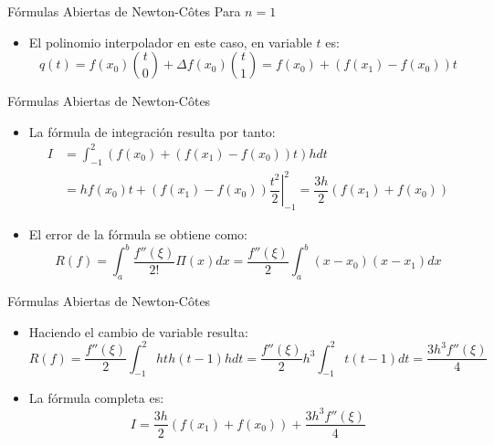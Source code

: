 \documentclass[12pt]{beamer}
\begin{document}
\begin{frame}{F\'ormulas Abiertas de Newton-C\^otes}
Para $n=1$
\begin{center}
\end{center}
\begin{itemize}
  \item El polinomio interpolador en este caso, en variable $t$ es:
  $$
    q(t) = f(x_0)\binom{t}{0}+\Delta f(x_0)\binom{t}{1} = f(x_0)+\left(f(x_1)-f(x_0)\right)t
  $$
  \end{itemize}
\end{frame}
\begin{frame}{F\'ormulas Abiertas de Newton-C\^otes}
  \begin{itemize}
    \item La fórmula de integración resulta por tanto:
    \begin{align*}
      I  & = \int_{-1}^{2}\left(f(x_0)+\left(f(x_1)-f(x_0)\right)t\right)hdt\\
      & = h\left.f(x_0)t+\left(f(x_1)-f(x_0)\right)\dfrac{t^2}{2}\right|_{-1}^{2} = \dfrac{3h}{2}\left(f(x_1)+f(x_0)\right)
    \end{align*}
    \item<2-> El error de la fórmula se obtiene como:
    $$
    R(f) = \int_{a}^{b}\dfrac{f''(\xi)}{2!}\Pi(x)dx = \dfrac{f''(\xi)}{2}\int_{a}^{b}(x-x_0)(x-x_1)dx
    $$
  \end{itemize}
\end{frame}
\begin{frame}{F\'ormulas Abiertas de Newton-C\^otes}
  \begin{itemize}
    \item Haciendo el cambio de variable resulta:
    \small{
    $$
    R(f) = \dfrac{f''(\xi)}{2}\int_{-1}^{2}hth(t-1)hdt = \dfrac{f''(\xi)}{2}h^3\int_{-1}^{2}t(t-1)dt = \dfrac{3h^3f''(\xi)}{4}
    $$}
    \item La f\'ormula completa es:
    \small{
    $$
    I = \dfrac{3h}{2}\left(f(x_1)+f(x_0)\right)+ \dfrac{3h^3f''(\xi)}{4}
    $$}
  \end{itemize}  
\end{frame}
\end{document}
